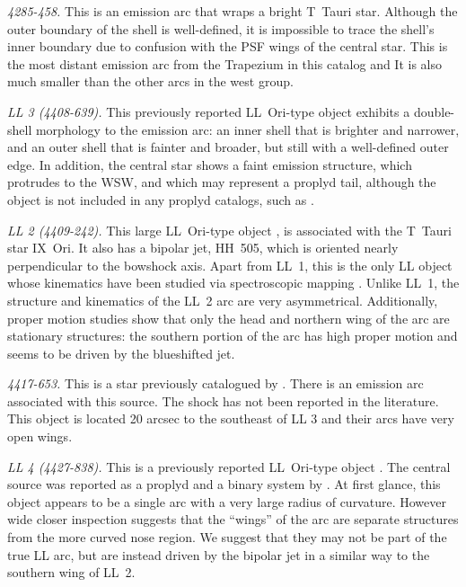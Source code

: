 \documentclass[apj, twocolumn]{aastex63}
\begin{document}
\textit{4285-458.} This is an emission arc that wraps a bright T~Tauri
star. Although the outer boundary of the shell is well-defined, it is
impossible to trace the shell's inner boundary due to confusion with
the PSF wings of the central star. This is the most distant emission
arc from the Trapezium in this catalog and It is also much smaller
than the other arcs in the west group.

\textit{LL 3 (4408-639).} This previously reported LL~Ori-type object
\citep{Bally:2001a} exhibits a double-shell morphology to the emission
arc: an inner shell that is brighter and narrower, and an outer shell
that is fainter and broader, but still with a well-defined outer edge.
In addition, the central star shows a faint emission structure, which
protrudes to the WSW, and which may represent a proplyd tail, although
the object is not included in any proplyd catalogs, such as
\citet{Ricci:2008a}.

\textit{LL 2 (4409-242).} This large LL~Ori-type object
\citep{Bally:2001a}, is associated with the T~Tauri star IX~Ori. It
also has a bipolar jet, HH~505, which is oriented nearly perpendicular
to the bowshock axis. Apart from LL~1, this is the only LL object
whose kinematics have been studied via spectroscopic mapping
\citep{Henney:2013a}. Unlike LL~1, the structure and kinematics of the
LL~2 arc are very asymmetrical.  Additionally, proper motion studies
\citep{Henney:2013a} show that only the head and northern wing of the
arc are stationary structures: the southern portion of the arc has
high proper motion and seems to be driven by the blueshifted jet.

\textit{4417-653.} This is a star previously catalogued by \citet{Hillenbrand:1997}.
There is an emission arc associated with this source. The shock has not been
reported in the literature. This object is located 20 arcsec to the southeast
of LL 3 and their arcs have very open wings.  

\textit{LL 4 (4427-838).} This is a previously reported LL~Ori-type
object \citep{Bally:2001a}. The central source was reported as a
proplyd and a binary system by \citet{Bally:2006a}. At first glance,
this object appears to be a single arc with a very large radius of
curvature. However wide closer inspection suggests that the ``wings''
of the arc are separate structures from the more curved nose
region. We suggest that they may not be part of the true LL arc, but
are instead driven by the bipolar jet \citep{Bally:2006a} in a similar
way to the southern wing of LL~2.
\end{document}
